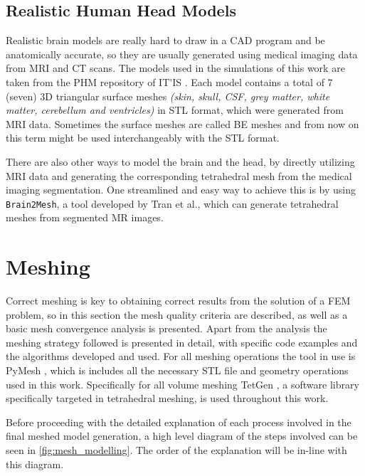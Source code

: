\subsection{Realistic Human Head Models}
\label{sec:phm_models}

Realistic brain models are really hard to draw in a \gls{CAD} program and be anatomically accurate, so they are usually generated using medical imaging data from \gls{MRI} and \gls{CT} scans. The models used in the simulations of this work are taken from the \gls{PHM} repository of \gls{IT'IS} \cite{ErikG.Lee2016,Lee2018,ITstissue}. Each model contains a total of 7 (seven) 3D triangular surface meshes \textit{(skin, skull, \gls{CSF}, grey matter, white matter, cerebellum and ventricles)} in \gls{STL} format, which were generated from \gls{MRI} data. Sometimes the surface meshes are called \gls{BE} meshes and from now on this term might be used interchangeably with the \gls{STL} format.

There are also other ways to model the brain and the head, by directly utilizing \gls{MRI} data and generating the corresponding tetrahedral mesh from the medical imaging segmentation. One streamlined and easy way to achieve this is by using \texttt{Brain2Mesh}, a tool developed by Tran et al.\cite{Tran2020}, which can generate tetrahedral meshes from segmented \gls{MR} images.

\section{Meshing}
\label{sec:fem_meshing}

Correct meshing is key to obtaining correct results from the solution of a \gls{FEM} problem, so in this section the mesh quality criteria are described, as well as a basic mesh convergence analysis is presented. Apart from the analysis the meshing strategy followed is presented in detail, with specific code examples and the algorithms developed and used. For all meshing operations the tool in use is PyMesh \cite{pymesh}, which is includes all the necessary \gls{STL} file and geometry operations used in this work. Specifically for all volume meshing TetGen \cite{tetgen}, a software library specifically targeted in tetrahedral meshing, is used throughout this work.

Before proceeding with the detailed explanation of each process involved in the final meshed model generation, a high level diagram of the steps involved can be seen in \autoref{fig:mesh_modelling}. The order of the explanation will be in-line with this diagram.

